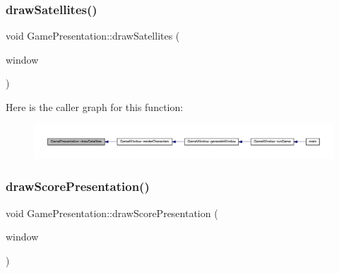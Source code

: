 \subsubsection{\texorpdfstring{draw\+Satellites()}{drawSatellites()}}
{\footnotesize\ttfamily void Game\+Presentation\+::draw\+Satellites (\begin{DoxyParamCaption}\item[{Render\+Window \&}]{window }\end{DoxyParamCaption})}

Here is the caller graph for this function\+:\nopagebreak
\begin{figure}[H]
\begin{center}
\leavevmode
\includegraphics[width=350pt]{class_game_presentation_a7a94467d53b62bd7a83035ea4fa386ac_icgraph}
\end{center}
\end{figure}
\mbox{\label{class_game_presentation_a38bab53e3d75b244e14ed2d7c2710fa0}} 
\subsubsection{\texorpdfstring{draw\+Score\+Presentation()}{drawScorePresentation()}}
{\footnotesize\ttfamily void Game\+Presentation\+::draw\+Score\+Presentation (\begin{DoxyParamCaption}\item[{Render\+Window \&}]{window }\end{DoxyParamCaption})}

